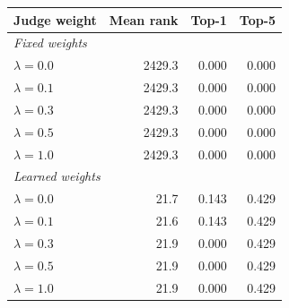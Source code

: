 \begin{tabular}{lrrr}
\toprule
Judge weight & Mean rank & Top-1 & Top-5 \\
\midrule
\multicolumn{4}{l}{\emph{Fixed weights}} \\
\quad $\lambda = 0.0$ & 2429.3 & 0.000 & 0.000 \\
\quad $\lambda = 0.1$ & 2429.3 & 0.000 & 0.000 \\
\quad $\lambda = 0.3$ & 2429.3 & 0.000 & 0.000 \\
\quad $\lambda = 0.5$ & 2429.3 & 0.000 & 0.000 \\
\quad $\lambda = 1.0$ & 2429.3 & 0.000 & 0.000 \\
\midrule
\multicolumn{4}{l}{\emph{Learned weights}} \\
\quad $\lambda = 0.0$ & 21.7 & 0.143 & 0.429 \\
\quad $\lambda = 0.1$ & 21.6 & 0.143 & 0.429 \\
\quad $\lambda = 0.3$ & 21.9 & 0.000 & 0.429 \\
\quad $\lambda = 0.5$ & 21.9 & 0.000 & 0.429 \\
\quad $\lambda = 1.0$ & 21.9 & 0.000 & 0.429 \\
\bottomrule
\end{tabular}